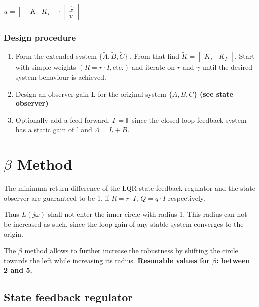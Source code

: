 \documentclass[10pt,a4paper]{scrartcl}
\begin{document}
\begin{multicols*}{3}
	$u=\begin{bmatrix}-K&K_I\end{bmatrix}\cdot\begin{bmatrix}\hat{x}\\v\end{bmatrix}$	
	
	
	\subsubsection{Design procedure}
	
	\begin{enumerate}
	\compaq
	\item
	Form the extended system $\{\tilde{A},\tilde{B},\tilde{C}\}$ . From that find $\tilde{K}=\begin{bmatrix}K,-K_I\end{bmatrix}$. Start with simple weights $(R=r\cdot I, \text{etc.})$ and iterate on $r$ and $\gamma$ until the desired system behaviour is achieved.
	\item
	Design an observer gain L for the original system $\{A,B,C\}$ \textbf{(see state observer)}
	\item
	Optionally add a feed forward. $\Gamma = \mathbb{I}$, since the closed loop feedback system has a static gain of $\mathbb{I}$ and $\Lambda = L + B$.
	\end{enumerate}
	
	\section{$\beta$ Method}
	
	The minimum return difference of the LQR state feedback regulator and the state observer are guaranteed to be 1, if $R=r\cdot I$, $Q=q\cdot I$ respectively.
	
	
	Thus $L(j\omega)$ shall not enter the inner circle with radius 1. This radius can not be increased as such, since the loop gain of any stable system converges to the origin.
	
	The $\beta$ method allows to further increase the robustness by shifting the circle towards the left while increasing its radius. \textbf{Resonable values for $\beta$: between 2 and 5.}
	
	\subsection*{State feedback regulator}
	

\end{multicols*}
\end{document}
